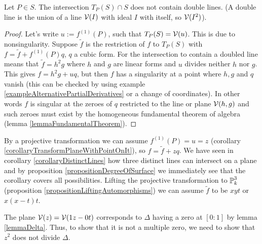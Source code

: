 \begin{lemma}
Let $P \in S$. The intersection $T_P(S) \cap S$ does not contain double lines.
(A double line is the union of a line $\operatorname{\mathcal V}(I)$ with ideal $I$ with itself, so $\operatorname{\mathcal V}(I^2)$).
\end{lemma}
\begin{proof}

Let's write $u := f^{(1)}(P)$, such that $T_P(S) = \operatorname{\mathcal V}(u)$.
This is due to nonsingularity. Suppose $\widetilde f$ is the restriction of $f$ to $T_P(S)$ with $f = \widetilde f + f^{(1)}(P)q$, $q$ a cubic form.
For the intersection to contain a doubled line means that $\widetilde f = h^2g$ where $h$ and $g$ are linear forms and $u$ divides neither $h$ nor $g$.
This gives $f = h^2g + uq$, but then $f$ has a singularity at a point where $h,g$ and $q$ vanish (this can be checked by using example \ref{exampleAlternativePartialDerivatives} or a change of coordinates).
In other words $f$ is singular at the zeroes of $q$ restricted to the line or plane $\operatorname{\mathcal V}(h,g)$ and such zeroes must exist by the homogeneous fundamental theorem of algebra (lemma \ref{lemmaFundamentalTheorem}).
\end{proof}

By a projective transformation we can assume $f^{(1)}(P) = u = z$ (corollary \ref{corollaryTransformPlaneWithPointOnIt}), so $f = \widetilde f + zq$.
We have seen in corollary \ref{corollaryDistinctLines} how three distinct lines can intersect on a plane and by proposition \ref{propositionDegreeOfSurface} we immediately see that the corollary covers all possibilities.
Lifting the projective transformation to $\operatorname{\mathbb P}^3_k$ (proposition \ref{propositionLiftingAutomorphisms}) we can assume $\widetilde f$ to be $xyt$ or $x(x-t)t$.

The plane $\operatorname{\mathcal V}(z) = \operatorname{\mathcal V}(1z- 0t)$ corresponds to $\Delta$ having a zero at $[0:1]$ by lemma \ref{lemmaDelta}.
Thus, to show that it is not a multiple zero, we need to show that $z^2$ does not divide $\Delta$.

